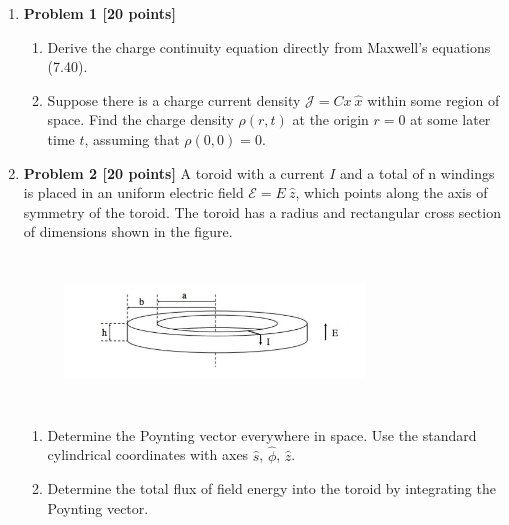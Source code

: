 \documentclass[fleqn]{article}
\begin{document}
  \begin{enumerate}
    \item \textbf{Problem 1 [20 points]}
    \begin{enumerate}
      \item Derive the charge continuity equation directly from Maxwell’s equations (7.40).

      
      \item Suppose there is a charge current density $\mathcal{J}=Cx ~ \hat{x}$ within some region of space. Find the
      charge density $\rho(r, t)$ at the origin $r=0$ at some later time $t$, assuming that $\rho(0, 0)=0$.

      
    \end{enumerate}


    \item \textbf{Problem 2 [20 points]} A toroid with a current $I$ and a total of n windings is placed in an uniform
    electric field $\mathcal{E}=E ~ \hat{z}$, which points along the axis of symmetry of the toroid. The toroid has a radius
    and rectangular cross section of dimensions shown in the figure.

      \begin{figure}[h!]
        \centering
        \includegraphics[height=4cm, width=8cm]{One.JPG}
      \end{figure}

      \begin{enumerate}
        \item Determine the Poynting vector everywhere in space. Use the standard cylindrical coordinates
        with axes $\hat{s}$, $\hat{\phi}$, $\hat{z}$.


        \item Determine the total flux of field energy into the toroid by integrating the Poynting vector.


\end{enumerate}
\end{enumerate}
\end{document}
